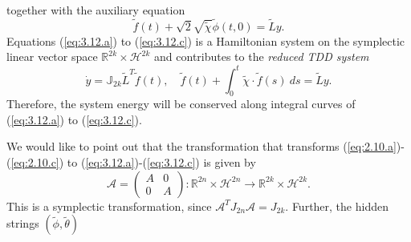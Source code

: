 together with the auxiliary equation
\begin{equation} \label{eq:3.13}
	\tilde f(t) + \sqrt{2} \sqrt{\tilde \chi} \tilde \phi(t,0) = \tilde L y.
\end{equation}
Equations (\ref{eq:3.12.a}) to (\ref{eq:3.12.c}) is a Hamiltonian system on the symplectic linear vector space $\mathbb R^{2k} \times \mathcal H^{2k}$ and contributes to the \emph{reduced TDD system}
\begin{equation}
	\dot {y} = \mathbb J_{2k} \tilde L^T \tilde f(t), \quad \tilde f(t) + \int_0^t \tilde \chi\cdot \tilde f(s)\ ds = \tilde L y.
\end{equation}
Therefore, the system energy will be conserved along integral curves of (\ref{eq:3.12.a}) to (\ref{eq:3.12.c}).

We would like to point out that the transformation that transforms (\ref{eq:2.10.a})-(\ref{eq:2.10.c}) to (\ref{eq:3.12.a})-(\ref{eq:3.12.c}) is given by
\begin{equation}
	\mathcal A = \begin{pmatrix}
		A& 0 \\
		0& A
	\end{pmatrix} : \mathbb R^{2n} \times \mathcal H^{2n} \to \mathbb R^{2k} \times \mathcal H^{2k}.
\end{equation}
This is a symplectic transformation, since $\mathcal A^T J_{2n} \mathcal A = J_{2k}$. Further, the hidden strings $(\tilde \phi,\tilde \theta)$ 
